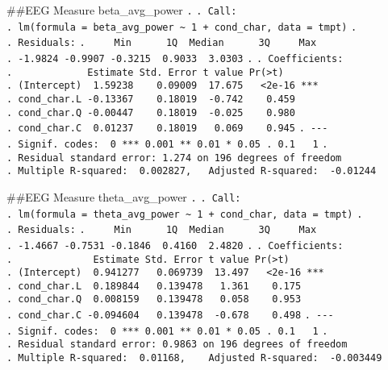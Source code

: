 \documentclass[
]{article}
\begin{document}
\#\#EEG Measure beta\_avg\_power \texttt{.} \texttt{.\ Call:}
\texttt{.\ lm(formula\ =\ beta\_avg\_power\ \textasciitilde{}\ 1\ +\ cond\_char,\ data\ =\ tmpt)}
\texttt{.} \texttt{.\ Residuals:}
\texttt{.\ \ \ \ \ Min\ \ \ \ \ \ 1Q\ \ Median\ \ \ \ \ \ 3Q\ \ \ \ \ Max}
\texttt{.\ -1.9824\ -0.9907\ -0.3215\ \ 0.9033\ \ 3.0303} \texttt{.}
\texttt{.\ Coefficients:}
\texttt{.\ \ \ \ \ \ \ \ \ \ \ \ \ Estimate\ Std.\ Error\ t\ value\ Pr(\textgreater{}\textbar{}t\textbar{})}
\texttt{.\ (Intercept)\ \ 1.59238\ \ \ \ 0.09009\ \ 17.675\ \ \ \textless{}2e-16\ ***}
\texttt{.\ cond\_char.L\ -0.13367\ \ \ \ 0.18019\ \ -0.742\ \ \ \ 0.459}
\texttt{.\ cond\_char.Q\ -0.00447\ \ \ \ 0.18019\ \ -0.025\ \ \ \ 0.980}
\texttt{.\ cond\_char.C\ \ 0.01237\ \ \ \ 0.18019\ \ \ 0.069\ \ \ \ 0.945}
\texttt{.\ -\/-\/-}
\texttt{.\ Signif.\ codes:\ \ 0\ \textquotesingle{}***\textquotesingle{}\ 0.001\ \textquotesingle{}**\textquotesingle{}\ 0.01\ \textquotesingle{}*\textquotesingle{}\ 0.05\ \textquotesingle{}.\textquotesingle{}\ 0.1\ \textquotesingle{}\ \textquotesingle{}\ 1}
\texttt{.}
\texttt{.\ Residual\ standard\ error:\ 1.274\ on\ 196\ degrees\ of\ freedom}
\texttt{.\ Multiple\ R-squared:\ \ 0.002827,\ \ \ Adjusted\ R-squared:\ \ -0.01244}

\#\#EEG Measure theta\_avg\_power \texttt{.} \texttt{.\ Call:}
\texttt{.\ lm(formula\ =\ theta\_avg\_power\ \textasciitilde{}\ 1\ +\ cond\_char,\ data\ =\ tmpt)}
\texttt{.} \texttt{.\ Residuals:}
\texttt{.\ \ \ \ \ Min\ \ \ \ \ \ 1Q\ \ Median\ \ \ \ \ \ 3Q\ \ \ \ \ Max}
\texttt{.\ -1.4667\ -0.7531\ -0.1846\ \ 0.4160\ \ 2.4820} \texttt{.}
\texttt{.\ Coefficients:}
\texttt{.\ \ \ \ \ \ \ \ \ \ \ \ \ \ Estimate\ Std.\ Error\ t\ value\ Pr(\textgreater{}\textbar{}t\textbar{})}
\texttt{.\ (Intercept)\ \ 0.941277\ \ \ 0.069739\ \ 13.497\ \ \ \textless{}2e-16\ ***}
\texttt{.\ cond\_char.L\ \ 0.189844\ \ \ 0.139478\ \ \ 1.361\ \ \ \ 0.175}
\texttt{.\ cond\_char.Q\ \ 0.008159\ \ \ 0.139478\ \ \ 0.058\ \ \ \ 0.953}
\texttt{.\ cond\_char.C\ -0.094604\ \ \ 0.139478\ \ -0.678\ \ \ \ 0.498}
\texttt{.\ -\/-\/-}
\texttt{.\ Signif.\ codes:\ \ 0\ \textquotesingle{}***\textquotesingle{}\ 0.001\ \textquotesingle{}**\textquotesingle{}\ 0.01\ \textquotesingle{}*\textquotesingle{}\ 0.05\ \textquotesingle{}.\textquotesingle{}\ 0.1\ \textquotesingle{}\ \textquotesingle{}\ 1}
\texttt{.}
\texttt{.\ Residual\ standard\ error:\ 0.9863\ on\ 196\ degrees\ of\ freedom}
\texttt{.\ Multiple\ R-squared:\ \ 0.01168,\ \ \ \ Adjusted\ R-squared:\ \ -0.003449}
\end{document}
